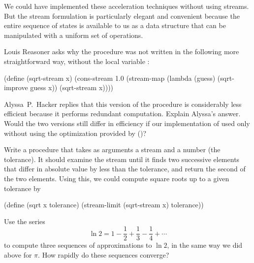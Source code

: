 We could have implemented these acceleration techniques without using streams.
But the stream formulation is particularly elegant and convenient because the entire sequence of states is available to us as a data structure that can be manipulated with a uniform set of operations.



\begin{exercise}
	\label{Exercise 3.63}
	Louis Reasoner asks why the  procedure was not written in the following more straightforward way, without the local variable :
	\begin{scheme}
	  (define (sqrt-stream x)
	    (cons-stream 1.0 (stream-map
	                      (lambda (guess)
	                        (sqrt-improve guess x))
	                      (sqrt-stream x))))
	\end{scheme}
	Alyssa~P.~Hacker replies that this version of the procedure is considerably less efficient because it performs redundant computation.
	Explain Alyssa’s answer.
	Would the two versions still differ in efficiency if our implementation of  used only  without using the optimization provided by  ()?
\end{exercise}



\begin{exercise}
	\label{Exercise 3.64}
	Write a procedure  that takes as arguments a stream and a number (the tolerance).
	It should examine the stream until it finds two successive elements that differ in absolute value by less than the tolerance, and return the second of the two elements.
	Using this, we could compute square roots up to a given tolerance by

	\begin{scheme}
	  (define (sqrt x tolerance)
	    (stream-limit (sqrt-stream x) tolerance))
	\end{scheme}
\end{exercise}



\begin{exercise}
	\label{Exercise 3.65}
	Use the series
	\[
		\ln 2 = 1 - \frac{1}{2} + \frac{1}{3} - \frac{1}{4} + \dotsb
	\]
	to compute three sequences of approximations to \( \ln 2 \), in the same way we did above for \( π \).
	How rapidly do these sequences converge?
\end{exercise}



